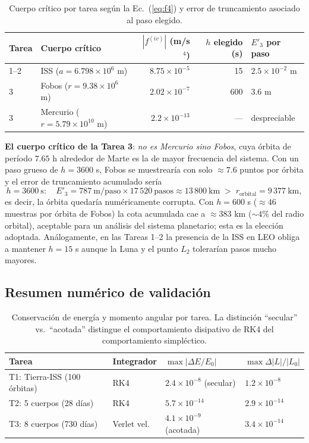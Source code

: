 \documentclass[11pt, a4paper]{article}
\begin{document}
\begin{table}[H]
	\centering
	\begin{tabular}{llrrl}
		\toprule
		Tarea & Cuerpo crítico & $|f^{(iv)}|$ (m/s$^4$) & $h$ elegido (s) & $E'_3$ por paso \\
		\midrule
		1--2 & ISS ($a = 6.798\times10^6$ m)   & $8.75\times10^{-5}$ & 15  & $2.5\times10^{-2}$ m \\
		3    & Fobos ($r = 9.38\times10^6$ m)  & $2.02\times10^{-7}$ & 600 & $3.6$ m \\
		3    & Mercurio ($r = 5.79\times10^{10}$ m) & $2.2\times10^{-13}$ & --- & despreciable \\
		\bottomrule
	\end{tabular}
	\caption{Cuerpo crítico por tarea según la Ec.~(\ref{eq:f4}) y error de truncamiento asociado al paso elegido.}
	\label{tab:h_por_tarea}
\end{table}

\textbf{El cuerpo crítico de la Tarea 3}: \emph{no es Mercurio sino Fobos}, cuya órbita de período $7.65$ h alrededor de Marte es la de mayor frecuencia del sistema. Con un paso grueso de $h = 3600$ s, Fobos se muestrearía con solo $\approx 7.6$ puntos por órbita y el error de truncamiento acumulado sería
\begin{equation}
	h = 3600\ \mathrm{s}: \quad E'_3 = 787\ \mathrm{m/paso} \times 17\,520\ \mathrm{pasos} \approx 13\,800\ \mathrm{km} \; > \; r_{\text{orbital}} = 9\,377\ \mathrm{km},
\end{equation}
es decir, la órbita quedaría numéricamente corrupta. Con $h = 600$ s ($\approx 46$ muestras por órbita de Fobos) la cota acumulada cae a $\approx 383$ km ($\sim 4\%$ del radio orbital), aceptable para un análisis del sistema planetario; esta es la elección adoptada. Análogamente, en las Tareas 1--2 la presencia de la ISS en LEO obliga a mantener $h = 15$ s aunque la Luna y el punto $L_2$ tolerarían pasos mucho mayores.

\subsection{Resumen numérico de validación}

\begin{table}[H]
	\centering
	\begin{tabular}{llll}
		\toprule
		Tarea & Integrador & $\max|\Delta E/E_0|$ & $\max \Delta|L|/|L_0|$ \\
		\midrule
		T1: Tierra-ISS (100 órbitas)   & RK4            & $2.4\times10^{-8}$ (secular) & $1.2\times10^{-8}$ \\
		T2: 5 cuerpos (28 días)        & RK4            & $5.7\times10^{-14}$          & $2.9\times10^{-14}$ \\
		T3: 8 cuerpos (730 días)       & Verlet vel.    & $4.1\times10^{-9}$ (acotada) & $3.4\times10^{-14}$ \\
		\bottomrule
	\end{tabular}
	\caption{Conservación de energía y momento angular por tarea. La distinción ``secular'' vs.\ ``acotada'' distingue el comportamiento disipativo de RK4 del comportamiento simpléctico.}
	\label{tab:conservacion}
\end{table}
\end{document}
